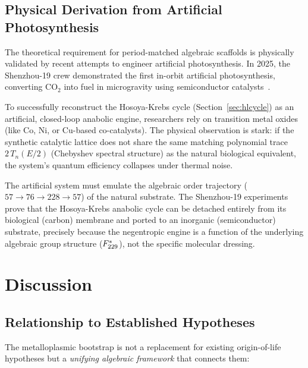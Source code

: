 \subsection{Physical Derivation from Artificial Photosynthesis}

The theoretical requirement for period-matched algebraic scaffolds is physically validated by recent attempts to engineer artificial photosynthesis. In 2025, the Shenzhou-19 crew demonstrated the first in-orbit artificial photosynthesis, converting CO$_2$ into fuel in microgravity using semiconductor catalysts~\cite{shenzhou19_photosynthesis}. 

To successfully reconstruct the Hosoya-Krebs cycle (Section~\ref{sec:hlcycle}) as an artificial, closed-loop anabolic engine, researchers rely on transition metal oxides (like Co, Ni, or Cu-based co-catalysts). The physical observation is stark: if the synthetic catalytic lattice does not share the same matching polynomial trace $2\,T_n(E/2)$ (Chebyshev spectral structure) as the natural biological equivalent, the system's quantum efficiency collapses under thermal noise. 

The artificial system must emulate the algebraic order trajectory ($57 \to 76 \to 228 \to 57$) of the natural substrate. The Shenzhou-19 experiments prove that the Hosoya-Krebs anabolic cycle can be detached entirely from its biological (carbon) membrane and ported to an inorganic (semiconductor) substrate, precisely because the negentropic engine is a function of the underlying algebraic group structure ($F_{229}^*$), not the specific molecular dressing.

\section{Discussion}\label{sec:disc}

\subsection{Relationship to Established Hypotheses}

The metalloplasmic bootstrap is not a replacement for existing origin-of-life hypotheses but a \emph{unifying algebraic framework} that connects them:

